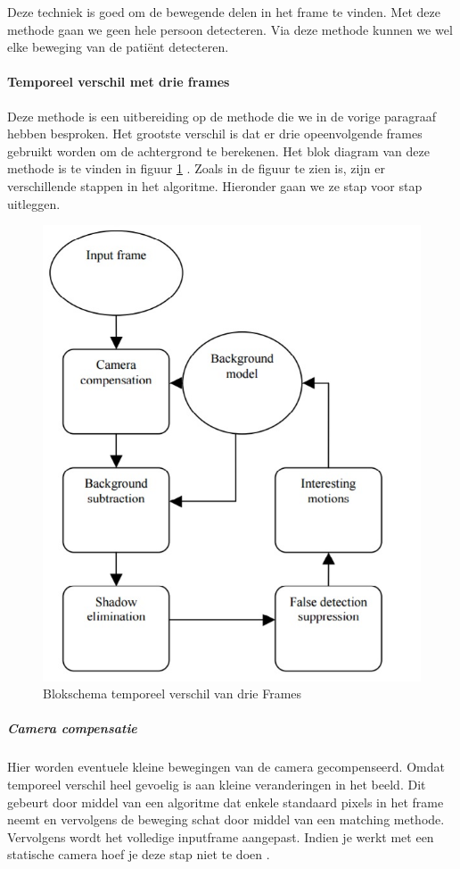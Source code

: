 Deze techniek is goed om de bewegende delen in het frame te vinden. Met deze methode gaan we geen hele persoon detecteren. Via deze methode kunnen we wel elke beweging van de pati\"ent detecteren.

\paragraph{Temporeel verschil met drie frames}
Deze methode is een uitbereiding op de methode die we in de vorige paragraaf hebben besproken. Het grootste verschil is dat er drie opeenvolgende frames gebruikt worden om de achtergrond te berekenen. Het blok diagram van deze methode is te vinden in figuur \ref{imgTeV} \cite{bibTeV}. 
Zoals in de figuur te zien is, zijn er verschillende stappen in het algoritme. Hieronder gaan we ze stap voor stap uitleggen.
\begin{figure}[hbp]
	\includegraphics[scale=0.6]{TemporeelVerschilDrieFrames}
	\caption{Blokschema temporeel verschil van drie Frames}
	\label{imgTeV}
\end{figure}

\subparagraph{Camera compensatie}
Hier worden eventuele kleine bewegingen van de camera gecompenseerd. Omdat temporeel verschil heel gevoelig is aan kleine veranderingen in het beeld. Dit gebeurt door middel van een algoritme dat enkele standaard pixels in het frame neemt en vervolgens de beweging schat door middel van een matching methode. Vervolgens wordt het volledige inputframe aangepast.  Indien je werkt met een statische camera hoef je deze stap niet te doen \cite{bibTeV}.


